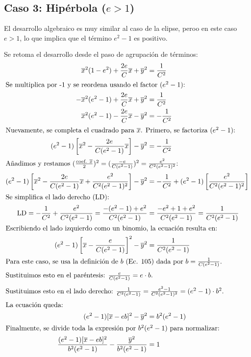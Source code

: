 \documentclass[12pt, a4paper]{article}
\newcommand{\xbar}{\overline{x}}
\newcommand{\ybar}{\overline{y}}
\begin{document}
\subsection{Caso 3: Hipérbola ($e>1$)}

El desarrollo algebraico es muy similar al caso de la elipse, peroo en este caso $e>1$, lo que implica que el término $e^{2}-1$ es positivo.

Se retoma el desarrollo desde el paso de agrupación de términos:
\begin{align}
    \xbar^{2}(1-e^{2}) + \frac{2e}{C}\xbar + \ybar^{2} &= \frac{1}{C^{2}} \\
    \intertext{Se multiplica por -1 y se reordena usando el factor $(e^{2}-1)$:}
    -\xbar^{2}(e^{2}-1) + \frac{2e}{C}\xbar + \ybar^{2} &= \frac{1}{C^{2}} \\
    \xbar^{2}(e^{2}-1) - \frac{2e}{C}\xbar - \ybar^{2} &= -\frac{1}{C^{2}} \\
    \intertext{Nuevamente, se completa el cuadrado para $\xbar$. Primero, se factoriza $(e^{2}-1)$:}
    (e^{2}-1) \left[\xbar^{2} - \frac{2e}{C(e^{2}-1)}\xbar\right] - \ybar^{2} &= -\frac{1}{C^{2}} \\
    \intertext{Añadimos y restamos $(\frac{\text{coef. } \xbar}{2})^{2} = (\frac{-e}{C(e^{2}-1)})^{2} = \frac{e^{2}}{C^{2}(e^{2}-1)^{2}}$:}
    (e^{2}-1) \left[\xbar^{2} - \frac{2e}{C(e^{2}-1)}\xbar + \frac{e^{2}}{C^{2}(e^{2}-1)^{2}}\right] - \ybar^{2} &= -\frac{1}{C^{2}} + (e^{2}-1)\left[\frac{e^{2}}{C^{2}(e^{2}-1)^{2}}\right] \\
    \intertext{Se simplifica el lado derecho (LD):}
    \text{LD} = -\frac{1}{C^{2}} + \frac{e^{2}}{C^{2}(e^{2}-1)} = \frac{-(e^{2}-1) + e^{2}}{C^{2}(e^{2}-1)} &= \frac{-e^{2}+1+e^{2}}{C^{2}(e^{2}-1)} = \frac{1}{C^{2}(e^{2}-1)} \\
    \intertext{Escribiendo el lado izquierdo como un binomio, la ecuación resulta en:}
    (e^{2}-1) \left[\xbar - \frac{e}{C(e^{2}-1)}\right]^{2} - \ybar^{2} &= \frac{1}{C^{2}(e^{2}-1)} \\
    \intertext{Para este caso, se usa la definición de $b$ (Ec. 105) dada por $b = \frac{1}{C(e^{2}-1)}$.}
    \intertext{Sustituimos esto en el paréntesis: $\frac{e}{C(e^{2}-1)} = e \cdot b$.}
    \intertext{Sustituimos esto en el lado derecho: $\frac{1}{C^{2}(e^{2}-1)} = \frac{e^{2}-1}{C^{2}(e^{2}-1)^{2}} = (e^{2}-1) \cdot b^{2}$.}
    \intertext{La ecuación queda:}
    (e^{2}-1)[\xbar - eb]^{2} - \ybar^{2} &= b^{2}(e^{2}-1) \\
    \intertext{Finalmente, se divide toda la expresión por $b^{2}(e^{2}-1)$ para normalizar:}
    \frac{(e^{2}-1)[\xbar - eb]^{2}}{b^{2}(e^{2}-1)} - \frac{\ybar^{2}}{b^{2}(e^{2}-1)} &= 1
\end{align}
\end{document}
